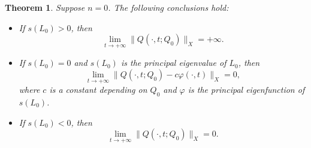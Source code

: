 \documentclass[11pt,reqno]{amsart}
\newtheorem{theorem}{Theorem}[section]
\numberwithin{equation}{section}
\begin{document}
\begin{theorem}\label{THM4.8}
Suppose $n=0$. The following conclusions hold:

\begin{itemize}[leftmargin=0.9cm]
\item[(i)] If $s(L_{0}) >0$, then
\begin{equation*}
\lim\limits_{t\to+\infty} \| Q(\cdot,t;Q_{0}) \|_{X} = +\infty.
\end{equation*}

\item[(ii)] If $s(L_{0}) = 0$ and $s(L_{0})$ is the principal eigenvalue of $L_{0}$, then
\begin{equation*}
\lim\limits_{t\to+\infty}  \| Q(\cdot,t;Q_{0}) -  c\varphi(\cdot,t) \|_{X} = 0,
\end{equation*}
where
$c$ is a constant depending on $Q_{0}$ and $\varphi$ is the principal eigenfunction of $s(L_{0})$.


\item[(iii)] If $s(L_{0}) < 0$, then
\begin{equation}\label{4-33}
\lim\limits_{t\to+\infty} \|Q(\cdot,t;Q_{0})\|_{X} = 0.
\end{equation}

\end{itemize}
\end{theorem}
\end{document}
